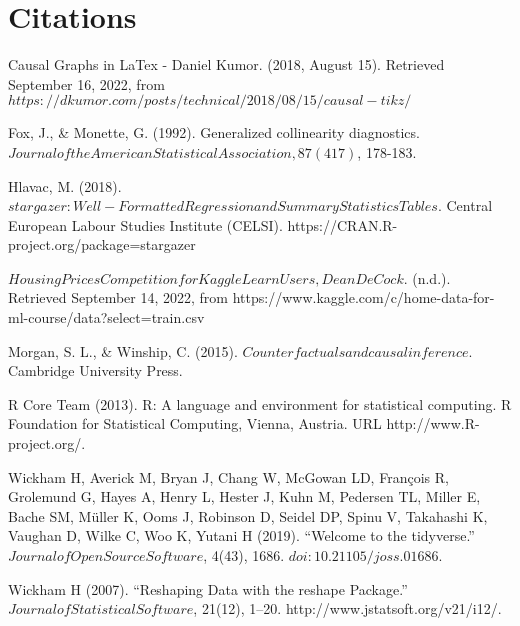\documentclass[a4paper]{article}
\begin{document}
\newpage
\newpage
\section{Citations}
\indent \indent Causal Graphs in LaTex - Daniel Kumor. (2018, August 15). Retrieved September 16, 2022, from $https://dkumor.com/posts/technical/2018/08/15/causal-tikz/$

\indent Fox, J., \& Monette, G. (1992). Generalized collinearity diagnostics. $Journal of the American Statistical Association, 87(417)$, 178-183.

\indent Hlavac, M. (2018). $stargazer: Well-Formatted Regression and Summary Statistics Tables.$ Central European Labour Studies Institute (CELSI). https://CRAN.R-project.org/package=stargazer

\indent $Housing Prices Competition for Kaggle Learn Users, Dean De Cock$. (n.d.). Retrieved September 14, 2022, from https://www.kaggle.com/c/home-data-for-ml-course/data?select=train.csv

\indent Morgan, S. L., \& Winship, C. (2015). $Counterfactuals and causal inference.$ Cambridge University Press.


\indent  R Core Team (2013). R: A language and environment for statistical
  computing. R Foundation for Statistical Computing, Vienna, Austria.
  URL http://www.R-project.org/.
  
\indent Wickham H, Averick M, Bryan J, Chang W, McGowan LD, François R, Grolemund G, Hayes A, Henry L, Hester J, Kuhn M, Pedersen TL, Miller E, Bache SM, Müller K, Ooms J, Robinson D, Seidel DP, Spinu V, Takahashi K, Vaughan D, Wilke C, Woo K, Yutani H (2019). “Welcome to the tidyverse.” $Journal of Open Source Software$, 4(43), 1686. $doi:10.21105/joss.01686.$

Wickham H (2007). “Reshaping Data with the reshape Package.” $Journal of Statistical Software$, 21(12), 1–20. http://www.jstatsoft.org/v21/i12/.





\newpage
\newpage
\end{document}
